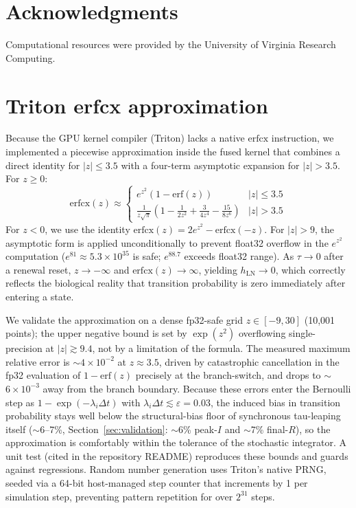 \documentclass[a4paper,fleqn]{cas-sc}
\theoremstyle{definition}
\theoremstyle{remark}
\begin{document}
\section*{Acknowledgments}

Computational resources were provided by the University of Virginia Research Computing.

\printcredits

\appendix

\section{Triton erfcx approximation}\label{app:erfcx}

Because the GPU kernel compiler (Triton) lacks a native $\mathrm{erfcx}$ instruction, we implemented a piecewise approximation inside the fused kernel that combines a direct identity for $|z| \leq 3.5$ with a four-term asymptotic expansion for $|z| > 3.5$. For $z \geq 0$:
\begin{equation}
    \mathrm{erfcx}(z) \approx \begin{cases}
        e^{z^2}(1 - \mathrm{erf}(z)) & |z| \leq 3.5 \\[4pt]
        \displaystyle\frac{1}{z\sqrt{\pi}}\left(1 - \frac{1}{2z^2} + \frac{3}{4z^4} - \frac{15}{8z^6}\right) & |z| > 3.5
    \end{cases}
\end{equation}
For $z < 0$, we use the identity $\mathrm{erfcx}(z) = 2e^{z^2} - \mathrm{erfcx}(-z)$. For $|z| > 9$, the asymptotic form is applied unconditionally to prevent float32 overflow in the $e^{z^2}$ computation ($e^{81} \approx 5.3 \times 10^{35}$ is safe; $e^{88.7}$ exceeds float32 range). As $\tau \to 0$ after a renewal reset, $z \to -\infty$ and $\mathrm{erfcx}(z) \to \infty$, yielding $h_{\mathrm{LN}} \to 0$, which correctly reflects the biological reality that transition probability is zero immediately after entering a state.

We validate the approximation on a dense fp32-safe grid $z \in [-9, 30]$ (10{,}001 points); the upper negative bound is set by $\exp(z^2)$ overflowing single-precision at $|z| \gtrsim 9.4$, not by a limitation of the formula. The measured maximum relative error is $\sim$$4 \times 10^{-2}$ at $z \approx 3.5$, driven by catastrophic cancellation in the fp32 evaluation of $1 - \mathrm{erf}(z)$ precisely at the branch-switch, and drops to $\sim$$6 \times 10^{-3}$ away from the branch boundary. Because these errors enter the Bernoulli step as $1 - \exp(-\lambda_i \Delta t)$ with $\lambda_i \Delta t \lesssim \varepsilon = 0.03$, the induced bias in transition probability stays well below the structural-bias floor of synchronous tau-leaping itself ($\sim$6--7\%, Section~\ref{sec:validation}: $\sim$6\% peak-$I$ and $\sim$7\% final-$R$), so the approximation is comfortably within the tolerance of the stochastic integrator. A unit test (cited in the repository README) reproduces these bounds and guards against regressions. Random number generation uses Triton's native PRNG, seeded via a 64-bit host-managed step counter that increments by 1 per simulation step, preventing pattern repetition for over $2^{31}$ steps.
\end{document}
